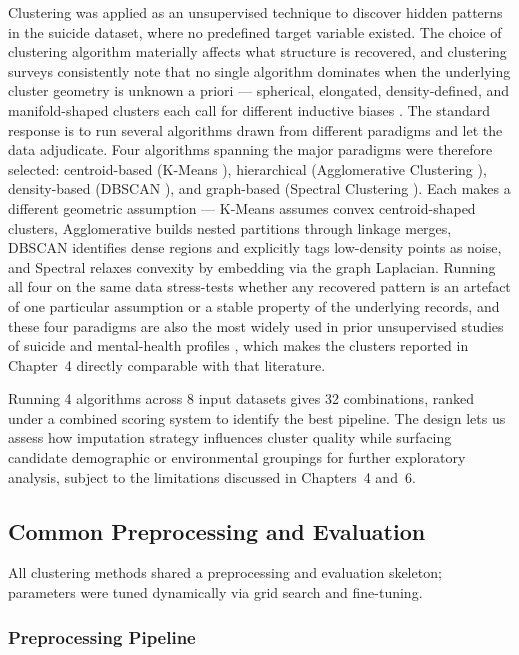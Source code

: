 Clustering was applied as an unsupervised technique to discover hidden patterns in the suicide dataset, where no predefined target variable existed. The choice of clustering algorithm materially affects what structure is recovered, and clustering surveys consistently note that no single algorithm dominates when the underlying cluster geometry is unknown a priori --- spherical, elongated, density-defined, and manifold-shaped clusters each call for different inductive biases \cite{ref49}. The standard response is to run several algorithms drawn from different paradigms and let the data adjudicate. Four algorithms spanning the major paradigms were therefore selected: centroid-based (K-Means \cite{ref13}), hierarchical (Agglomerative Clustering \cite{ref14}), density-based (DBSCAN \cite{ref15}), and graph-based (Spectral Clustering \cite{ref16}). Each makes a different geometric assumption --- K-Means assumes convex centroid-shaped clusters, Agglomerative builds nested partitions through linkage merges, DBSCAN identifies dense regions and explicitly tags low-density points as noise, and Spectral relaxes convexity by embedding via the graph Laplacian. Running all four on the same data stress-tests whether any recovered pattern is an artefact of one particular assumption or a stable property of the underlying records, and these four paradigms are also the most widely used in prior unsupervised studies of suicide and mental-health profiles \cite{ref34, ref35, ref36, ref37}, which makes the clusters reported in Chapter~4 directly comparable with that literature.

Running 4 algorithms across 8 input datasets gives 32 combinations, ranked under a combined scoring system to identify the best pipeline. The design lets us assess how imputation strategy influences cluster quality while surfacing candidate demographic or environmental groupings for further exploratory analysis, subject to the limitations discussed in Chapters~4 and~6.

\subsection{Common Preprocessing and Evaluation}

All clustering methods shared a preprocessing and evaluation skeleton; parameters were tuned dynamically via grid search and fine-tuning.

\subsubsection{Preprocessing Pipeline}

